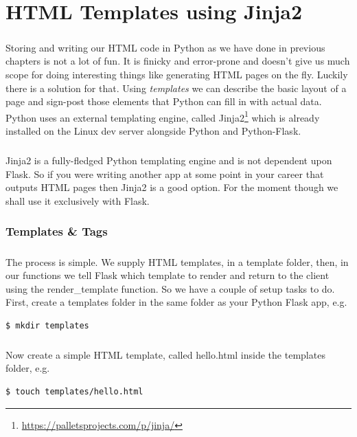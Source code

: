 \documentclass[12pt, a4paper, oneside]{book}
\begin{document}
{%
\chapter{HTML Templates using Jinja2}
\label{style}
\paragraph{} Storing and writing our HTML code in Python as we have done in previous chapters is not a lot of fun. It is finicky and error-prone and doesn't give us much scope for doing interesting things like generating HTML pages on the fly. Luckily there is a solution for that. Using \emph{templates} we can describe the basic layout of a page and sign-post those elements that Python can fill in with actual data. Python uses an external templating engine, called Jinja2\footnote{\url{https://palletsprojects.com/p/jinja/}} which is already installed on the Linux dev server alongside Python and Python-Flask.

\paragraph{} Jinja2 is a fully-fledged Python templating engine and is not dependent upon Flask. So if you were writing another app at some point in your career that outputs HTML pages then Jinja2 is a good option. For the moment though we shall use it exclusively with Flask.


\subsection{Templates \& Tags}
\label{templates-tags}
\paragraph{} The process is simple. We supply HTML templates, in a template folder, then, in our functions we tell Flask which template to render and return to the client using the render\_template function. So we have a couple of setup tasks to do. First, create a templates folder in the same folder as your Python Flask app, e.g.

\begin{lstlisting}[style=DOS]
$ mkdir templates
\end{lstlisting}

\paragraph{} Now create a simple HTML template, called hello.html inside the templates folder, e.g.
\begin{lstlisting}[style=DOS]
$ touch templates/hello.html
\end{lstlisting}

}
\end{document}
